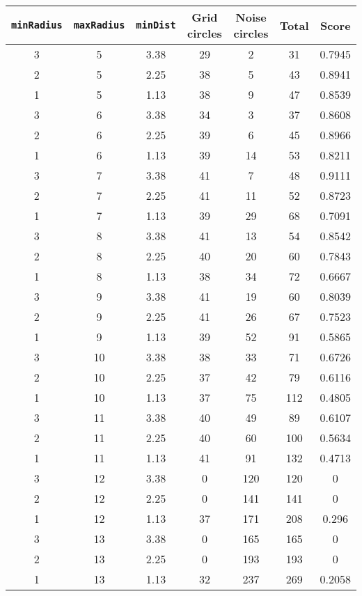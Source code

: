 \documentclass[letterpaper, 12pt]{article}
\begin{document}
\begin{longtable}{|c|c|c|c|c|c|c|}
\hline
\textbf{\texttt{minRadius}} & \textbf{\texttt{maxRadius}} & \textbf{\texttt{minDist}} & \textbf{Grid circles} & \textbf{Noise circles} & \textbf{Total} & \textbf{Score} \\
\hline
3 & 5 & 3.38 & 29 & 2 & 31 & 0.7945 \\
\hline
2 & 5 & 2.25 & 38 & 5 & 43 & 0.8941 \\
\hline
1 & 5 & 1.13 & 38 & 9 & 47 & 0.8539 \\
\hline
3 & 6 & 3.38 & 34 & 3 & 37 & 0.8608 \\
\hline
2 & 6 & 2.25 & 39 & 6 & 45 & 0.8966 \\
\hline
1 & 6 & 1.13 & 39 & 14 & 53 & 0.8211 \\
\hline
3 & 7 & 3.38 & 41 & 7 & 48 & 0.9111 \\
\hline
2 & 7 & 2.25 & 41 & 11 & 52 & 0.8723 \\
\hline
1 & 7 & 1.13 & 39 & 29 & 68 & 0.7091 \\
\hline
3 & 8 & 3.38 & 41 & 13 & 54 & 0.8542 \\
\hline
2 & 8 & 2.25 & 40 & 20 & 60 & 0.7843 \\
\hline
1 & 8 & 1.13 & 38 & 34 & 72 & 0.6667 \\
\hline
3 & 9 & 3.38 & 41 & 19 & 60 & 0.8039 \\
\hline
2 & 9 & 2.25 & 41 & 26 & 67 & 0.7523 \\
\hline
1 & 9 & 1.13 & 39 & 52 & 91 & 0.5865 \\
\hline
3 & 10 & 3.38 & 38 & 33 & 71 & 0.6726 \\
\hline
2 & 10 & 2.25 & 37 & 42 & 79 & 0.6116 \\
\hline
1 & 10 & 1.13 & 37 & 75 & 112 & 0.4805 \\
\hline
3 & 11 & 3.38 & 40 & 49 & 89 & 0.6107 \\
\hline
2 & 11 & 2.25 & 40 & 60 & 100 & 0.5634 \\
\hline
1 & 11 & 1.13 & 41 & 91 & 132 & 0.4713 \\
\hline
3 & 12 & 3.38 & 0 & 120 & 120 & 0 \\
\hline
2 & 12 & 2.25 & 0 & 141 & 141 & 0 \\
\hline
1 & 12 & 1.13 & 37 & 171 & 208 & 0.296 \\
\hline
3 & 13 & 3.38 & 0 & 165 & 165 & 0 \\
\hline
2 & 13 & 2.25 & 0 & 193 & 193 & 0 \\
\hline
1 & 13 & 1.13 & 32 & 237 & 269 & 0.2058 \\

\end{longtable}
\end{document}
